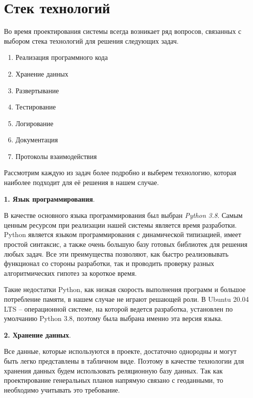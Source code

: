 \section{\Large{Стек технологий}}
Во время проектирования системы всегда возникает ряд вопросов,
связанных с выбором стека технологий для решения следующих задач.

\begin{enumerate}
    \item Реализация программного кода
    \item Хранение данных
    \item Развертывание
    \item Тестирование
    \item Логирование
    \item Документация
    \item Протоколы взаимодействия
\end{enumerate}

Рассмотрим каждую из задач более подробно и выберем технологию, которая наиболее подходит для её решения в нашем случае.

\noindent \textbf{1. Язык программирования}.

В качестве основного языка программирования был выбран \textit{Python 3.8}\cite{PythonReference}.
Самым ценным ресурсом при реализации нашей системы является время разработки. Python является языком программирования
с динамической типизацией, имеет простой синтаксис,
а также очень большую базу готовых библиотек для решения любых задач.
Все эти преимущества позволяют, как быстро реализовывать функционал со стороны разработки, так и проводить проверку
разных алгоритмических гипотез за короткое время.

Такие недостатки Python, как низкая скорость выполнения программ и большое потребление памяти, в нашем случае
не играют решающей роли\cite{PythonProsAndCons}.
В Ubuntu 20.04 LTS -- операционной системе, на которой ведется разработка, установлен по умолчанию Python 3.8, поэтому
была выбрана именно эта версия языка.

\noindent \textbf{2. Хранение данных}.

Все данные, которые используются в проекте, достаточно однородны и могут быть легко представлены в табличном виде.
Поэтому в качестве технологии для хранения данных будем использовать реляционную базу данных.
Так как проектирование генеральных планов напрямую связано с геоданными, то необходимо учитывать это требование.

